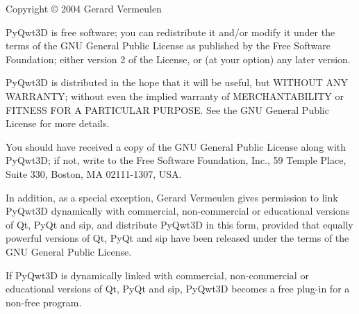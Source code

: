 Copyright \copyright{} 2004 Gerard Vermeulen

PyQwt3D is free software; you can redistribute it and/or modify it under the
terms of the GNU General Public License as published by the Free Software
Foundation; either version 2 of the License, or (at your option) any later
version.

PyQwt3D is distributed in the hope that it will be useful, but WITHOUT ANY
WARRANTY; without even the implied warranty of MERCHANTABILITY or FITNESS
FOR A PARTICULAR PURPOSE.  See the GNU  General Public License for more
details.

You should have received a copy of the GNU General Public License along with
PyQwt3D; if not, write to the Free Software Foundation, Inc., 59 Temple Place,
Suite 330, Boston, MA 02111-1307, USA.

In addition, as a special exception, Gerard Vermeulen gives permission to
link PyQwt3D dynamically with commercial, non-commercial or educational 
versions of Qt, PyQt and sip, and distribute PyQwt3D in this form, provided
that equally powerful versions of Qt, PyQt and sip have been released under
the terms of the GNU General Public License.

If PyQwt3D is dynamically linked with commercial, non-commercial or
educational versions of Qt, PyQt and sip, PyQwt3D becomes a free plug-in
for a non-free program.
